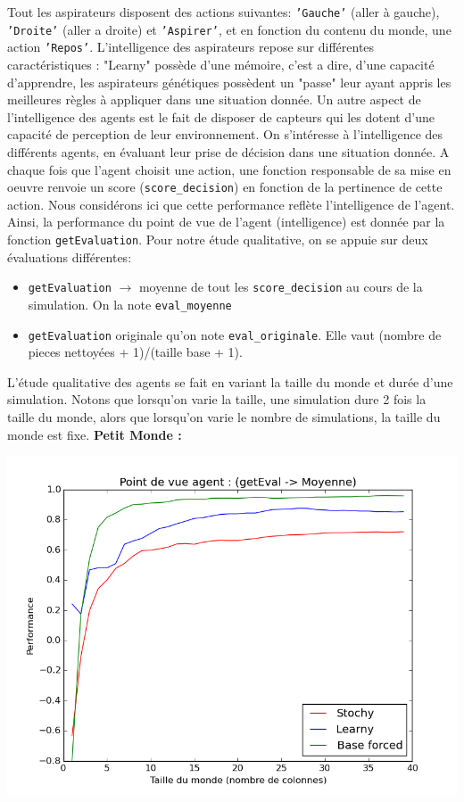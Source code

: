 \documentclass[12pt]{article}
\begin{document}
\justify
Tout les aspirateurs disposent des actions suivantes: \texttt{'Gauche'} (aller à gauche), \texttt{'Droite'} (aller a droite) et \texttt{'Aspirer'}, et en fonction du contenu du monde, une action \texttt{'Repos'}.
\justify
L'intelligence des aspirateurs repose sur différentes caractéristiques : "Learny" possède d'une mémoire, c'est a dire, d'une capacité d'apprendre, les aspirateurs génétiques possèdent un "passe" leur ayant appris les meilleures règles à appliquer dans une situation donnée. Un autre aspect de l'intelligence des agents est le fait de disposer de capteurs qui les dotent d'une capacité de perception de leur environnement.
\justify
On s'intéresse à l'intelligence des différents agents, en évaluant leur prise de décision dans une situation donnée. 
A chaque fois que l'agent choisit une action, une fonction responsable de sa mise en oeuvre renvoie un score (\texttt{score\_decision}) en fonction de la pertinence de cette action. Nous considérons ici que cette performance reflète l'intelligence de l'agent. Ainsi, la performance du point de vue de l'agent (intelligence) est donnée par la fonction \texttt{getEvaluation}. Pour notre étude qualitative, on se appuie sur deux évaluations différentes:
\begin{itemize}
\item \texttt{getEvaluation} $\rightarrow$ moyenne de tout les \texttt{score\_decision} au cours de la simulation. On la note \texttt{eval\_moyenne}
\item \texttt{getEvaluation} originale qu'on note \texttt{eval\_originale}. Elle vaut (nombre de pieces nettoyées + 1)/(taille base + 1).
\end{itemize}
\justify
L'étude qualitative des agents se fait en variant la taille du monde et durée d'une simulation. Notons que lorsqu'on varie la taille, une simulation dure 2 fois la taille du monde, alors que lorsqu'on varie le nombre de simulations, la taille du monde est fixe. 
\clearpage
\justify
\textbf{Petit Monde :}
\justify
\begin{center}
\includegraphics[scale=0.5]{geteval_moy_01}
\end{center}
\end{document}
